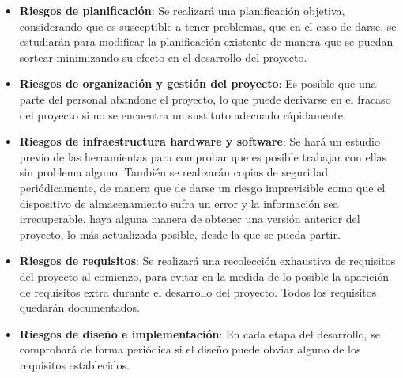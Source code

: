 \begin{itemize}

    \item \textbf{Riesgos de planificación}: Se realizará una planificación objetiva, considerando que 
    es susceptible a tener problemas, que en el caso de darse, se estudiarán para modificar la planificación 
    existente de manera que se puedan sortear minimizando su efecto en el desarrollo del proyecto.

    \item \textbf{Riesgos de organización y gestión del proyecto}: Es posible que una parte del personal 
    abandone el proyecto, lo que puede derivarse en el fracaso del proyecto si no se encuentra un sustituto 
    adecuado rápidamente.

    \item \textbf{Riesgos de infraestructura hardware y software}: Se hará un estudio previo de las herramientas para 
    comprobar que es posible trabajar con ellas sin problema alguno. También se realizarán copias de seguridad periódicamente, 
    de manera que de darse un riesgo imprevisible como que el dispositivo de almacenamiento sufra un error y la información 
    sea irrecuperable, haya alguna manera de obtener una versión anterior del proyecto, lo más actualizada posible, desde la que 
    se pueda partir. 

    \item \textbf{Riesgos de requisitos}: Se realizará una recolección exhaustiva de requisitos del proyecto al comienzo, para 
    evitar en la medida de lo posible la aparición de requisitos extra durante el desarrollo del proyecto. Todos los requisitos 
    quedarán documentados.

    \item \textbf{Riesgos de diseño e implementación}: En cada etapa del desarrollo, se comprobará de forma periódica si el diseño 
    puede obviar alguno de los requisitos establecidos.

\end{itemize}

